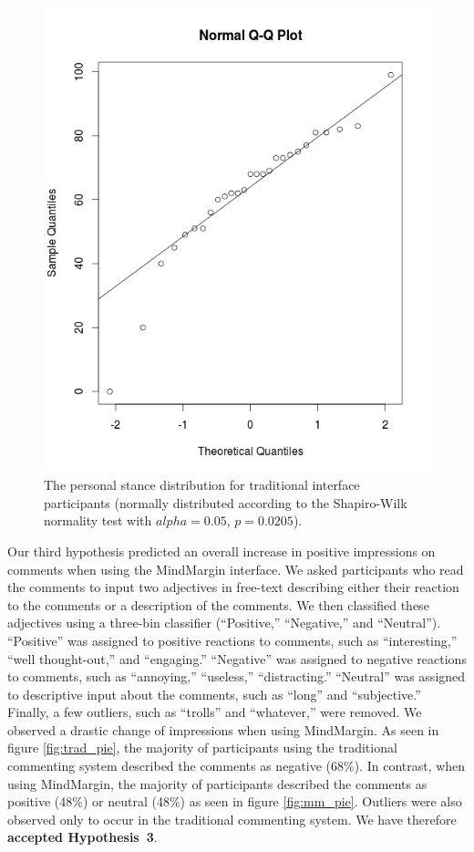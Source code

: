 \begin{figure}
\centering
\includegraphics[scale=0.25]{regular_normal.png}
\caption{The personal stance distribution for traditional interface participants (normally distributed according to the Shapiro-Wilk normality test with $alpha=0.05$, $p=0.0205$).}
\label{fig:reg_normal}
\end{figure}

Our third hypothesis predicted an overall increase in positive impressions on comments when using the MindMargin interface. We asked participants who read the comments to input two adjectives in free-text describing either their reaction to the comments or a description of the comments. We then classified these adjectives using a three-bin classifier (“Positive,” “Negative,” and “Neutral”). “Positive” was assigned to positive reactions to comments, such as “interesting,” “well thought-out,” and “engaging.” “Negative” was assigned to negative reactions to comments, such as “annoying,” “useless,” “distracting.” “Neutral” was assigned to descriptive input about the comments, such as “long” and “subjective.” Finally, a few outliers, such as “trolls” and “whatever,” were removed. We observed a drastic change of impressions when using MindMargin. As seen in figure \ref{fig:trad_pie}, the majority of participants using the traditional commenting system described the comments as negative (68\%). In contrast, when using MindMargin, the majority of participants described the comments as positive (48\%) or neutral (48\%) as seen in figure \ref{fig:mm_pie}.  Outliers were also observed only to occur in the traditional commenting system. We have therefore \textbf{accepted Hypothesis~3}. 

